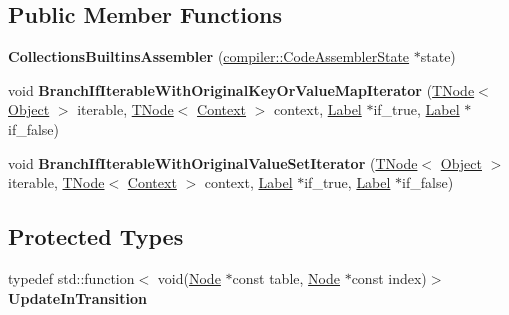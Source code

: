 \subsection*{Public Member Functions}
\begin{DoxyCompactItemize}
\item 
\mbox{\label{classv8_1_1internal_1_1CollectionsBuiltinsAssembler_acba39aadcba8c5e47b38e9c195b07459}} 
{\bfseries Collections\+Builtins\+Assembler} (\mbox{\hyperlink{classv8_1_1internal_1_1compiler_1_1CodeAssemblerState}{compiler\+::\+Code\+Assembler\+State}} $\ast$state)
\item 
\mbox{\label{classv8_1_1internal_1_1CollectionsBuiltinsAssembler_a6f40e33f8087a63a870bc88dc6dde917}} 
void {\bfseries Branch\+If\+Iterable\+With\+Original\+Key\+Or\+Value\+Map\+Iterator} (\mbox{\hyperlink{classv8_1_1internal_1_1compiler_1_1TNode}{T\+Node}}$<$ \mbox{\hyperlink{classv8_1_1internal_1_1Object}{Object}} $>$ iterable, \mbox{\hyperlink{classv8_1_1internal_1_1compiler_1_1TNode}{T\+Node}}$<$ \mbox{\hyperlink{classv8_1_1internal_1_1Context}{Context}} $>$ context, \mbox{\hyperlink{classv8_1_1internal_1_1compiler_1_1CodeAssemblerLabel}{Label}} $\ast$if\+\_\+true, \mbox{\hyperlink{classv8_1_1internal_1_1compiler_1_1CodeAssemblerLabel}{Label}} $\ast$if\+\_\+false)
\item 
\mbox{\label{classv8_1_1internal_1_1CollectionsBuiltinsAssembler_a1194078f3f922c5f46685883889187a3}} 
void {\bfseries Branch\+If\+Iterable\+With\+Original\+Value\+Set\+Iterator} (\mbox{\hyperlink{classv8_1_1internal_1_1compiler_1_1TNode}{T\+Node}}$<$ \mbox{\hyperlink{classv8_1_1internal_1_1Object}{Object}} $>$ iterable, \mbox{\hyperlink{classv8_1_1internal_1_1compiler_1_1TNode}{T\+Node}}$<$ \mbox{\hyperlink{classv8_1_1internal_1_1Context}{Context}} $>$ context, \mbox{\hyperlink{classv8_1_1internal_1_1compiler_1_1CodeAssemblerLabel}{Label}} $\ast$if\+\_\+true, \mbox{\hyperlink{classv8_1_1internal_1_1compiler_1_1CodeAssemblerLabel}{Label}} $\ast$if\+\_\+false)
\end{DoxyCompactItemize}
\subsection*{Protected Types}
\begin{DoxyCompactItemize}
\item 
\mbox{\label{classv8_1_1internal_1_1CollectionsBuiltinsAssembler_a7ede9835dd82012bb0c27649bd1e9b64}} 
typedef std\+::function$<$ void(\mbox{\hyperlink{classv8_1_1internal_1_1compiler_1_1Node}{Node}} $\ast$const table, \mbox{\hyperlink{classv8_1_1internal_1_1compiler_1_1Node}{Node}} $\ast$const index)$>$ {\bfseries Update\+In\+Transition}
\end{DoxyCompactItemize}
